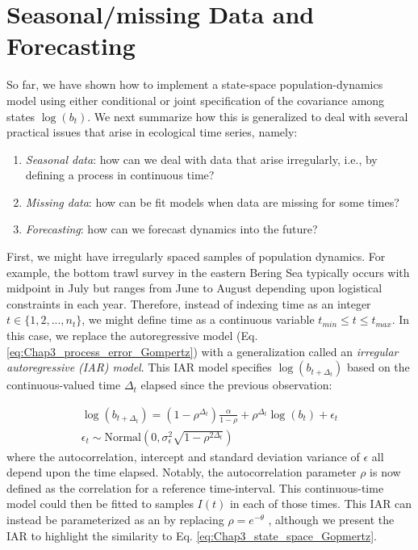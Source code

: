 \section{Seasonal/missing Data and Forecasting} \label{sec:Chap3_seasonal}

So far, we have shown how to implement a state-space population-dynamics model using either conditional or joint specification of the covariance among states \( \log(b_t)\).  We next summarize how this is generalized to deal with several practical issues that arise in ecological time series, namely:
\begin{enumerate}
    \item \textit{Seasonal data}: how can we deal with data that arise irregularly, i.e., by defining a process in continuous time?

    \item \textit{Missing data}: how can be fit models when data are missing for some times?

    \item \textit{Forecasting}: how can we forecast dynamics into the future?
\end{enumerate}

First, we might have irregularly spaced samples of population dynamics.  For example, the bottom trawl survey in the eastern Bering Sea typically occurs with midpoint in July but ranges from June to August depending upon logistical constraints in each year.  Therefore, instead of indexing time as an integer \( t \in \{1,2,...,n_t\} \), we might define time as a continuous variable \( t_{min} \leq t \leq t_{max} \).  In this case, we replace the autoregressive model (Eq. \ref{eq:Chap3_process_error_Gompertz}) with a generalization called an \textit{irregular autoregressive (IAR) model}.  This IAR model specifies \( \log(b_{t+\Delta_t}) \) based on the continuous-valued time \(\Delta_t\) elapsed since the previous observation:

\begin{equation} \label{eq:Chap3_IAR}
\begin{gathered}
    \log(b_{t+\Delta_t}) = (1-\rho^{\Delta_t}) \frac{\alpha}{1-\rho} + \rho^{\Delta_t} \log(b_t) + \epsilon_t \\
    \epsilon_t \sim \mathrm{Normal}(0, \sigma_{\epsilon}^2 \sqrt{1-\rho^{2 \Delta_t}})
\end{gathered}
\end{equation}
where the autocorrelation, intercept and standard deviation variance of \(\epsilon\) all depend upon the time elapsed.  Notably, the autocorrelation parameter \(\rho\) is now defined as the correlation for a reference time-interval.  This continuous-time model could then be fitted to samples \(I(t)\) in each of those times.  This IAR can instead be parameterized as an  by replacing \( \rho = e^{-\theta} \) \cite{dennis_density-dependent_2014}, although we present the IAR to highlight the similarity to Eq. \ref{eq:Chap3_state_space_Gopmertz}.   

